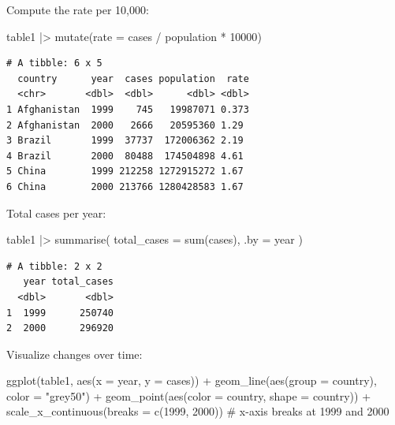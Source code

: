 \documentclass[
  letterpaper,
  DIV=11,
  numbers=noendperiod]{scrreprt}
\newenvironment{Shaded}{\begin{snugshade}}{\end{snugshade}}
\newcommand{\AttributeTok}[1]{\textcolor[rgb]{0.40,0.45,0.13}{#1}}
\newcommand{\CommentTok}[1]{\textcolor[rgb]{0.37,0.37,0.37}{#1}}
\newcommand{\DecValTok}[1]{\textcolor[rgb]{0.68,0.00,0.00}{#1}}
\newcommand{\FunctionTok}[1]{\textcolor[rgb]{0.28,0.35,0.67}{#1}}
\newcommand{\NormalTok}[1]{\textcolor[rgb]{0.00,0.23,0.31}{#1}}
\newcommand{\SpecialCharTok}[1]{\textcolor[rgb]{0.37,0.37,0.37}{#1}}
\newcommand{\StringTok}[1]{\textcolor[rgb]{0.13,0.47,0.30}{#1}}
\begin{document}
Compute the rate per 10,000:

\begin{Shaded}
\begin{Highlighting}[]
\NormalTok{table1 }\SpecialCharTok{|\textgreater{}}
  \FunctionTok{mutate}\NormalTok{(}\AttributeTok{rate =}\NormalTok{ cases }\SpecialCharTok{/}\NormalTok{ population }\SpecialCharTok{*} \DecValTok{10000}\NormalTok{)}
\end{Highlighting}
\end{Shaded}

\begin{verbatim}
# A tibble: 6 x 5
  country      year  cases population  rate
  <chr>       <dbl>  <dbl>      <dbl> <dbl>
1 Afghanistan  1999    745   19987071 0.373
2 Afghanistan  2000   2666   20595360 1.29 
3 Brazil       1999  37737  172006362 2.19 
4 Brazil       2000  80488  174504898 4.61 
5 China        1999 212258 1272915272 1.67 
6 China        2000 213766 1280428583 1.67 
\end{verbatim}

Total cases per year:

\begin{Shaded}
\begin{Highlighting}[]
\NormalTok{table1 }\SpecialCharTok{|\textgreater{}}
  \FunctionTok{summarise}\NormalTok{(}
    \AttributeTok{total\_cases =} \FunctionTok{sum}\NormalTok{(cases),}
    \AttributeTok{.by =}\NormalTok{ year}
\NormalTok{  )}
\end{Highlighting}
\end{Shaded}

\begin{verbatim}
# A tibble: 2 x 2
   year total_cases
  <dbl>       <dbl>
1  1999      250740
2  2000      296920
\end{verbatim}

Visualize changes over time:

\begin{Shaded}
\begin{Highlighting}[]
\FunctionTok{ggplot}\NormalTok{(table1, }\FunctionTok{aes}\NormalTok{(}\AttributeTok{x =}\NormalTok{ year, }\AttributeTok{y =}\NormalTok{ cases)) }\SpecialCharTok{+}
  \FunctionTok{geom\_line}\NormalTok{(}\FunctionTok{aes}\NormalTok{(}\AttributeTok{group =}\NormalTok{ country), }\AttributeTok{color =} \StringTok{"grey50"}\NormalTok{) }\SpecialCharTok{+}
  \FunctionTok{geom\_point}\NormalTok{(}\FunctionTok{aes}\NormalTok{(}\AttributeTok{color =}\NormalTok{ country, }\AttributeTok{shape =}\NormalTok{ country)) }\SpecialCharTok{+}
  \FunctionTok{scale\_x\_continuous}\NormalTok{(}\AttributeTok{breaks =} \FunctionTok{c}\NormalTok{(}\DecValTok{1999}\NormalTok{, }\DecValTok{2000}\NormalTok{)) }\CommentTok{\# x{-}axis breaks at 1999 and 2000}
\end{Highlighting}
\end{Shaded}
\end{document}

